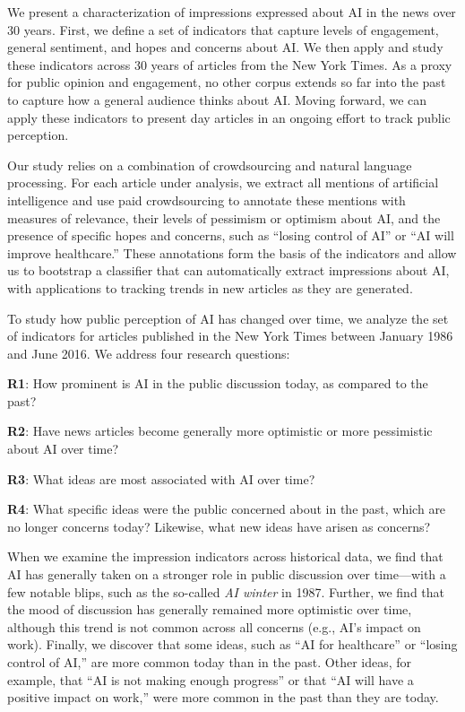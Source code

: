 \documentclass[letterpaper]{article}
\begin{document}
We present a characterization of impressions expressed about AI in the news over 30 years. First, we define a set of indicators that capture levels of engagement, general sentiment, and hopes and concerns about AI. We then apply and study these indicators across 30 years of articles from the New York Times. As a proxy for public opinion and engagement, no other corpus extends so far into the past to capture how a general audience thinks about AI. Moving forward, we can apply these indicators to present day articles in an ongoing effort to track public perception.

Our study relies on a combination of crowdsourcing and natural language processing. For each article under analysis, we extract all mentions of artificial intelligence and use paid crowdsourcing to annotate these mentions with measures of relevance, their levels of pessimism or optimism about AI, and the presence of specific hopes and concerns, such as ``losing control of AI'' or ``AI will improve healthcare.'' These annotations form the basis of the indicators and allow us to bootstrap a classifier that can automatically extract impressions about AI, with applications to tracking trends in new articles as they are generated.

To study how public perception of AI has changed over time, we analyze the set of indicators for articles published in the New York Times between January 1986 and June 2016. We address four research questions:

\textbf{R1}: How prominent is AI in the public discussion today, as compared to the past? %

\textbf{R2}: Have news articles become generally more optimistic or more pessimistic about AI over time? %

\textbf{R3}: What ideas are most associated with AI over time? %

\textbf{R4}: What specific ideas were the public concerned about in the past, which are no longer concerns today? Likewise, what new ideas have arisen as concerns?

When we examine the impression indicators across historical data, we find that AI has generally taken on a stronger role in public discussion over time---with a few notable blips, such as the so-called \textit{AI winter} in 1987. Further, we find that the mood of discussion has generally remained more optimistic over time, although this trend is not common across all concerns (e.g., AI's impact on work). Finally, we discover that some ideas, such as ``AI for healthcare'' or ``losing control of AI,'' are more common today than in the past. Other ideas, for example, that ``AI is not making enough progress'' or that ``AI will have a positive impact on work,'' were more common in the past than they are today. 
\end{document}
